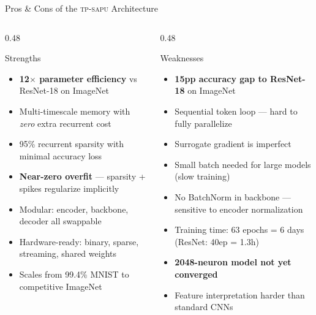 \documentclass[aspectratio=169,11pt]{beamer}
\newcommand{\hl}[1]{{\color{highlight}\textbf{#1}}}
\newcommand{\tpsapu}{\textsc{tp-sapu}}
\begin{document}
\begin{frame}[shrink=8]{Pros \& Cons of the \tpsapu{} Architecture}
\begin{columns}[T]
\begin{column}{0.48\textwidth}
  \begin{exampleblock}{Strengths}
    \begin{itemize}\small
      \item \hl{12$\times$ parameter efficiency} vs ResNet-18 on ImageNet
      \item Multi-timescale memory with \emph{zero} extra recurrent cost
      \item 95\% recurrent sparsity with minimal accuracy loss
      \item \hl{Near-zero overfit} — sparsity + spikes regularize implicitly
      \item Modular: encoder, backbone, decoder all swappable
      \item Hardware-ready: binary, sparse, streaming, shared weights
      \item Scales from 99.4\% MNIST to competitive ImageNet
    \end{itemize}
  \end{exampleblock}
\end{column}
\begin{column}{0.48\textwidth}
  \begin{alertblock}{Weaknesses}
    \begin{itemize}\small
      \item \hl{15pp accuracy gap to ResNet-18} on ImageNet
      \item Sequential token loop — hard to fully parallelize
      \item Surrogate gradient is imperfect
      \item Small batch needed for large models (slow training)
      \item No BatchNorm in backbone — sensitive to encoder normalization
      \item Training time: 63 epochs = 6 days (ResNet: 40ep = 1.3h)
      \item \hl{2048-neuron model not yet converged}
      \item Feature interpretation harder than standard CNNs
    \end{itemize}
  \end{alertblock}
\end{column}
\end{columns}
\end{frame}
\end{document}
